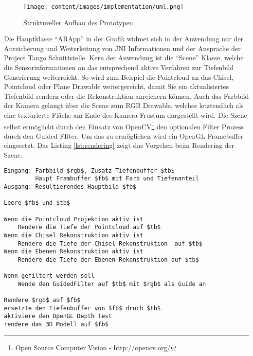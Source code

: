 \begin{figure}[h]
  \centering
	\texttt{[image: content/images/implementation/uml.png]} 
  \caption{Struktureller Aufbau des Prototypen}
  \label{fig:structure}
\end{figure}

Die Hauptklasse \enquote{ARApp} in der Grafik widmet sich in der Anwendung nur der Anreicherung und Weiterleitung von JNI Informationen und der Ansprache der Project Tango Schnittstelle. Kern der Anwendung ist die \enquote{Scene} Klasse, welche die Sensorinformationen an das entsprechend aktive Verfahren zur Tiefenbild Generierung weiterreicht. So wird zum Beispiel die Pointcloud an das Chisel, Pointcloud oder Plane Drawable weitergereicht, damit Sie ein aktualisiertes Tiefenbild rendern oder die Rekonstruktion anreichern können. Auch das Farbbild der Kamera gelangt über die Scene zum RGB Drawable, welches letztendlich als eine texturierte Fläche am Ende des Kamera Frustum dargestellt wird. Die Szene selbst ermöglicht durch den Einsatz von OpenCV\footnote{Open Source Computer Vision - http://opencv.org/} den optionalen Filter Prozess durch den Guided FIlter. Um das zu ermöglichen wird ein OpenGL Framebuffer eingesetzt. Das Listing \ref{lst:rendering} zeigt das Vorgehen beim Rendering der Szene.

\begin{lstlisting}[mathescape,caption=Rendering der Szene, label=lst:rendering, float=htbp]
Eingang: Farbbild $rgb$, Zusatz Tiefenbuffer $tb$
         Haupt Frambuffer $fb$ mit Farb und Tiefenanteil
Ausgang: Resultierendes Hauptbild $fb$

Leere $fb$ und $tb$

Wenn die Pointcloud Projektion aktiv ist
    Rendere die Tiefe der Pointcloud auf $tb$
Wenn die Chisel Rekonstruktion aktiv ist
    Rendere die Tiefe der Chisel Rekonstruktion  auf $tb$
Wenn die Ebenen Rekonstruktion aktiv ist
    Rendere die Tiefe der Ebenen Rekonstruktion auf $tb$
    
Wenn gefiltert werden soll
    Wende den GuidedFilter auf $tb$ mit $rgb$ als Guide an
        
Rendere $rgb$ auf $fb$ 
ersetzte den Tiefenbuffer von $fb$ druch $tb$
aktiviere den OpenGL Depth Test
rendere das 3D Modell auf $fb$
\end{lstlisting}
